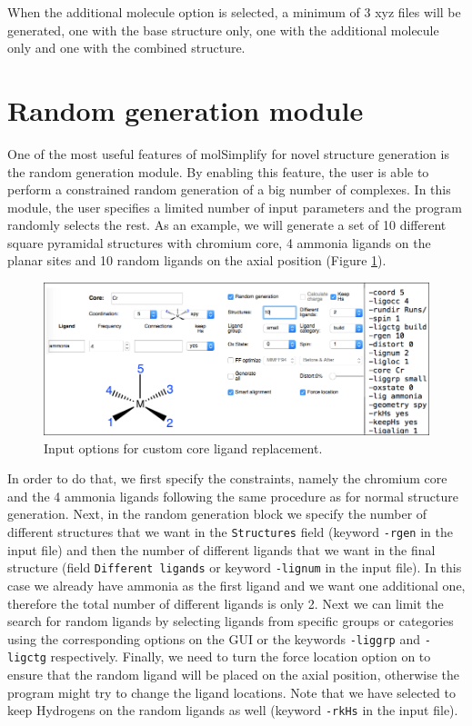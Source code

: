 \documentclass[a4paper,12pt]{assignment}
\begin{document}
When the additional molecule option is selected, a minimum of 3 xyz files will be generated, one with the base structure only, one with the additional molecule only and one with the combined structure.


\section{Random generation module} \label{rgen}

One of the most useful features of molSimplify for novel structure generation is the random generation module. By enabling this feature, the user is able to perform a constrained random generation of a big number of complexes. In this module, the user specifies a limited number of input parameters and the program randomly selects the rest. As an example, we will generate a set of 10 different square pyramidal structures with chromium core, 4 ammonia ligands on the planar sites and 10 random ligands on the axial position (Figure \ref{ran1a}).

\begin{figure}[htb!]
\centering
\includegraphics[width=\textwidth]{./Figures/fig8a.png}
\caption{Input options for custom core ligand replacement.}
\label{ran1a}
\end{figure}

In order to do that, we first specify the constraints, namely the chromium core and the 4 ammonia ligands following the same procedure as for normal structure generation. Next, in the random generation block we specify the number of different structures that we want in the \texttt{Structures} field (keyword \texttt{-rgen} in the input file) and then the number of different ligands that we want in the final structure (field \texttt{Different ligands} or keyword \texttt{-lignum} in the input file). In this case we already have ammonia as the first ligand and we want one additional one, therefore the total number of different ligands is only 2. Next we can limit the search for random ligands by selecting ligands from specific groups or categories using the corresponding options on the GUI or the keywords \texttt{-liggrp} and \texttt{-ligctg} respectively. Finally, we need to turn the force location option on to ensure that the random ligand will be placed on the axial position, otherwise the program might try to change the ligand locations. Note that we have selected to keep Hydrogens on the random ligands as well (keyword \texttt{-rkHs} in the input file).
\end{document}
